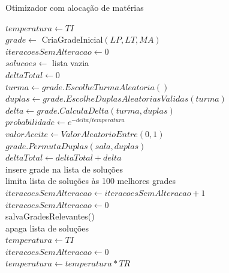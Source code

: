 \begin{algorithm}
	\caption{Otimizador com alocação de matérias}
	\label{alg:otimizadorCompleto}
	$temperatura \leftarrow TI$\\
	$grade \leftarrow$ CriaGradeInicial$(LP, LT, MA)$\\
	$iteracoesSemAlteracao \leftarrow 0$\\
	$solucoes \leftarrow$ lista vazia\\
	 {
		$deltaTotal \leftarrow 0$\\
		 {
			$turma \leftarrow grade.EscolheTurmaAleatoria()$\\
			$duplas \leftarrow grade.EscolheDuplasAleatoriasValidas(turma)$\\
			$delta \leftarrow grade.CalculaDelta(turma, duplas)$\\
			$probabilidade \leftarrow e^{-delta/temperatura}$\\
			$valorAceite \leftarrow ValorAleatorioEntre(0, 1)$\\
			 {
				$grade.PermutaDuplas(sala, duplas)$\\
				$deltaTotal \leftarrow deltaTotal + delta$\\
				 {
					insere grade na lista de soluções\\
					limita lista de soluções às 100 melhores grades\\
				}
			}
		}
		 {
			$iteracoesSemAlteracao \leftarrow iteracoesSemAlteracao + 1$\\
		}{
			$iteracoesSemAlteracao \leftarrow 0$\\
		}
		 {
			salvaGradesRelevantes()\\
			apaga lista de soluções\\
			$temperatura \leftarrow TI$\\
			$iteracoesSemAlteracao \leftarrow 0$\\
		}
		$temperatura \leftarrow temperatura * TR$
	}
\end{algorithm}
\pagebreak